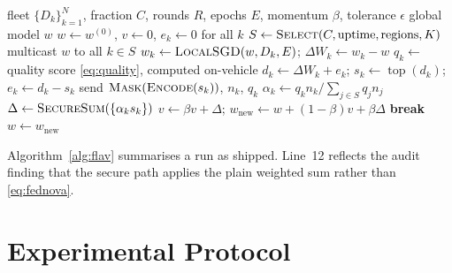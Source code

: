 \documentclass[journal]{IEEEtran}
\DeclareMathOperator{\topk}{top}
\begin{document}
\begin{algorithm}[!t]
\caption{One FL-AV training run}\label{alg:flav}
\begin{algorithmic}[1]
\Require fleet $\{D_k\}_{k=1}^{N}$, fraction $C$, rounds $R$, epochs $E$, momentum $\beta$, tolerance $\epsilon$
\Ensure global model $w$
\State $w\gets w^{(0)}$, $v\gets 0$, $e_k\gets 0$ for all $k$
  \State $S\gets\textsc{Select}(C,\text{uptime},\text{regions},K)$ 
  \State multicast $w$ to all $k\in S$
    \State $w_k\gets\textsc{LocalSGD}(w,D_k,E)$;\; $\Delta W_k\gets w_k-w$
    \State $q_k\gets$ quality score \eqref{eq:quality}, computed on-vehicle
    \State $d_k\gets\Delta W_k+e_k$;\; $s_k\gets\topk(d_k)$;\; $e_k\gets d_k-s_k$
    \State send $\textsc{Mask}(\textsc{Encode}(s_k))$, $n_k$, $q_k$
  \EndFor
  \State $\alpha_k\gets q_k n_k/\sum_{j\in S}q_j n_j$ \Comment{\eqref{eq:alpha}}
  \State $\Delta\gets\textsc{SecureSum}(\{\alpha_k s_k\})$ \Comment{\eqref{eq:secagg}}
  \State $v\gets\beta v+\Delta$;\; $w_{\mathrm{new}}\gets w+(1-\beta)v+\beta\Delta$
   \textbf{break} \EndIf
  \State $w\gets w_{\mathrm{new}}$
\EndFor
\end{algorithmic}
\end{algorithm}

Algorithm~\ref{alg:flav} summarises a run as shipped. Line~12 reflects the audit finding that the secure path applies the plain weighted sum rather than \eqref{eq:fednova}.

\section{Experimental Protocol}\label{sec:protocol}
\end{document}
